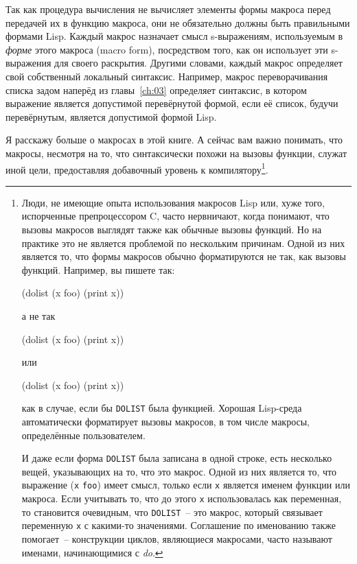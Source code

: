 Так как процедура вычисления не вычисляет элементы формы макроса перед передачей их в
функцию макроса, они не обязательно должны быть правильными формами Lisp. Каждый макрос
назначает смысл s-выражениям, используемым в \textit{форме} этого макроса (macro form),
посредством того, как он использует эти s-выражения для своего раскрытия. Другими словами,
каждый макрос определяет свой собственный локальный синтаксис. Например, макрос
переворачивания списка задом наперёд из главы~\ref{ch:03} определяет синтаксис, в котором
выражение является допустимой перевёрнутой формой, если её список, будучи перевёрнутым,
является допустимой формой Lisp.

Я расскажу больше о макросах в этой книге. А сейчас вам важно понимать, что макросы,
несмотря на то, что синтаксически похожи на вызовы функции, служат иной цели, предоставляя
добавочный уровень к компилятору\footnote{Люди, не имеющие опыта использования макросов
  Lisp или, хуже того, испорченные препроцессором C, часто нервничают, когда понимают, что
  вызовы макросов выглядят также как обычные вызовы функций. Но на практике это не
  является проблемой по нескольким причинам. Одной из них является то, что формы макросов
  обычно форматируются не так, как вызовы функций. Например, вы пишете так:

\begin{myverb}
(dolist (x foo)
  (print x))
\end{myverb}

\noindent{}а не так

\begin{myverb}
(dolist (x foo) (print x))
\end{myverb}

\noindent{}или 

\begin{myverb}
(dolist (x foo) (print x))
\end{myverb}

\noindent{}как в случае, если бы \lstinline{DOLIST} была функцией. Хорошая Lisp-среда автоматически
форматирует вызовы макросов, в том числе макросы, определённые пользователем.

И даже если форма \lstinline{DOLIST} была записана в одной строке, есть несколько вещей,
указывающих на то, что это макрос. Одной из них является то, что выражение (\lstinline{x}
\lstinline{foo}) имеет смысл, только если \lstinline{x} является именем функции или макроса. Если
учитывать то, что до этого \lstinline{x} использовалась как переменная, то становится
очевидным, что \lstinline{DOLIST}~-- это макрос, который связывает переменную \lstinline{x} с
какими-то значениями. Соглашение по именованию также помогает~-- конструкции циклов,
являющиеся макросами, часто называют именами, начинающимися с \textit{do}.}.

